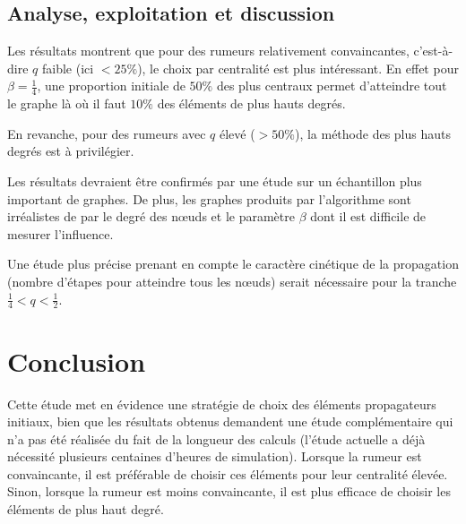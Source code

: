 \documentclass{article}
\begin{document}
\FloatBarrier
\subsection{Analyse, exploitation et discussion}
Les résultats montrent que pour des rumeurs relativement convaincantes, c'est-à-dire $q$ faible (ici $<25\%$), le choix par centralité est plus intéressant. En effet pour $\beta = \frac{1}{4}$, une proportion initiale de $50 \%$ des plus centraux permet d'atteindre tout le graphe là où il faut $10 \%$ des éléments de plus hauts degrés.

En revanche, pour des rumeurs avec $q$ élevé ($>50\%$), la méthode des plus hauts degrés est à privilégier. 

Les résultats devraient être confirmés par une étude sur un échantillon plus important de graphes. De plus, les graphes produits par l'algorithme sont irréalistes de par le degré des nœuds et le paramètre $\beta$ dont il est difficile de mesurer l'influence.

Une étude plus précise prenant en compte le caractère cinétique de la propagation (nombre d'étapes pour atteindre tous les nœuds) serait nécessaire pour la tranche $\frac{1}{4} < q < \frac{1}{2}$.

\section{Conclusion}
Cette étude met en évidence une stratégie de choix des éléments propagateurs initiaux, bien que les résultats obtenus demandent une étude complémentaire qui n'a pas été réalisée du fait de la longueur des calculs (l'étude actuelle a déjà nécessité plusieurs centaines d'heures de simulation). Lorsque la rumeur est convaincante, il est préférable de choisir ces éléments pour leur centralité élevée. Sinon, lorsque la rumeur est moins convaincante, il est plus efficace de choisir les éléments de plus haut degré.
\end{document}
